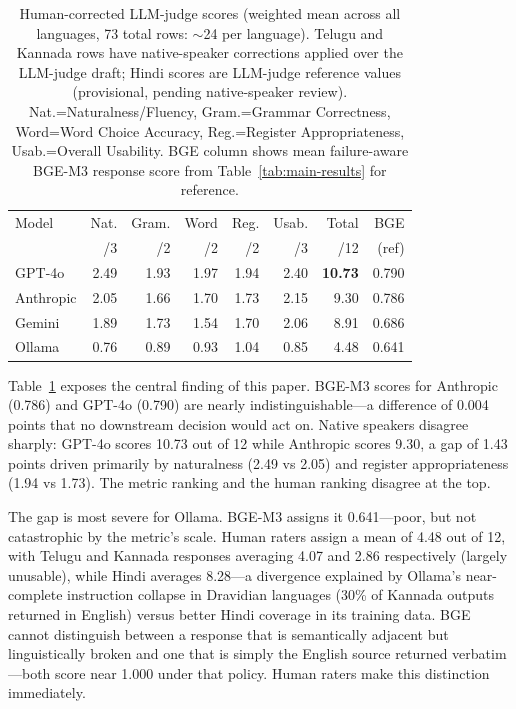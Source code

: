 \begin{table}[t]
\centering
\small
\begin{tabular}{lrrrrrrr}
\toprule
Model & Nat. & Gram. & Word & Reg. & Usab. & Total & BGE \\
      & /3   & /2    & /2   & /2   & /3    & /12   & (ref) \\
\midrule
GPT-4o    & 2.49 & 1.93 & 1.97 & 1.94 & 2.40 & \textbf{10.73} & 0.790 \\
Anthropic & 2.05 & 1.66 & 1.70 & 1.73 & 2.15 & 9.30  & 0.786 \\
Gemini    & 1.89 & 1.73 & 1.54 & 1.70 & 2.06 & 8.91  & 0.686 \\
Ollama    & 0.76 & 0.89 & 0.93 & 1.04 & 0.85 & 4.48  & 0.641 \\
\bottomrule
\end{tabular}
\caption{Human-corrected LLM-judge scores (weighted mean across all languages,
73 total rows: $\sim$24 per language). Telugu and Kannada rows have
native-speaker corrections applied over the LLM-judge draft; Hindi scores are
LLM-judge reference values (provisional, pending native-speaker review).
Nat.=Naturalness/Fluency, Gram.=Grammar Correctness, Word=Word Choice
Accuracy, Reg.=Register Appropriateness, Usab.=Overall Usability. BGE column
shows mean failure-aware BGE-M3 response score from
Table~\ref{tab:main-results} for reference.}
\label{tab:human-eval}
\end{table}

\enspace
Table~\ref{tab:human-eval} exposes the central finding of this paper.
BGE-M3 scores for Anthropic (0.786) and GPT-4o (0.790) are nearly
indistinguishable---a difference of 0.004 points that no downstream decision
would act on. Native speakers disagree sharply: GPT-4o scores 10.73 out of 12
while Anthropic scores 9.30, a gap of 1.43 points driven primarily by
naturalness (2.49 vs 2.05) and register appropriateness (1.94 vs 1.73). The
metric ranking and the human ranking disagree at the top.

The gap is most severe for Ollama. BGE-M3 assigns it 0.641---poor, but not
catastrophic by the metric's scale. Human raters assign a mean of 4.48 out of
12, with Telugu and Kannada responses averaging 4.07 and 2.86 respectively
(largely unusable), while Hindi averages 8.28---a divergence explained by
Ollama's near-complete instruction collapse in Dravidian languages (30\% of
Kannada outputs returned in English) versus better Hindi coverage in its
training data. BGE cannot distinguish between a response that is semantically
adjacent but linguistically broken and one that is simply the English source
returned verbatim---both score near 1.000 under that policy. Human raters make
this distinction immediately.

